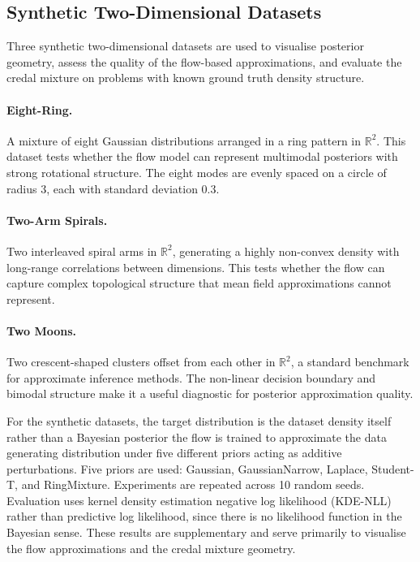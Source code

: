 \subsection{Synthetic Two-Dimensional Datasets}

Three synthetic two-dimensional datasets 
are used to visualise posterior geometry, 
assess the quality of the flow-based 
approximations, and evaluate the credal 
mixture on problems with known ground 
truth density structure.

\paragraph{Eight-Ring.} A mixture of eight 
Gaussian distributions arranged in a ring 
pattern in $\mathbb{R}^2$. This dataset 
tests whether the flow model can represent 
multimodal posteriors with strong rotational 
structure. The eight modes are evenly spaced 
on a circle of radius 3, each with standard 
deviation 0.3.

\paragraph{Two-Arm Spirals.} Two interleaved 
spiral arms in $\mathbb{R}^2$, generating a 
highly non-convex density with long-range 
correlations between dimensions. This tests 
whether the flow can capture complex 
topological structure that mean field 
approximations cannot represent.

\paragraph{Two Moons.} Two crescent-shaped 
clusters offset from each other in 
$\mathbb{R}^2$, a standard benchmark for 
approximate inference methods. The 
non-linear decision boundary and 
bimodal structure make it a useful 
diagnostic for posterior approximation 
quality.

For the synthetic datasets, the target 
distribution is the dataset density 
itself rather than a Bayesian posterior 
the flow is trained to approximate 
the data generating distribution under 
five different priors acting as additive 
perturbations. Five priors are used: 
Gaussian, GaussianNarrow, Laplace, 
Student-T, and RingMixture. Experiments 
are repeated across 10 random seeds. 
Evaluation uses kernel density estimation 
negative log likelihood (KDE-NLL) rather 
than predictive log likelihood, since 
there is no likelihood function in the 
Bayesian sense. These results are 
supplementary and serve primarily to 
visualise the flow approximations and 
the credal mixture geometry.

